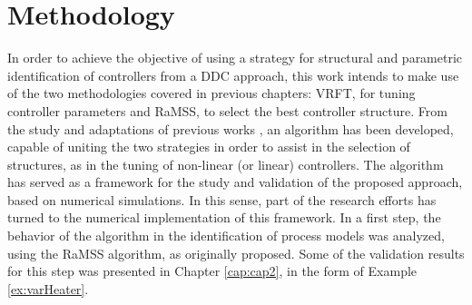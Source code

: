 \section{Methodology}\label{sec:CSS_metod} 

In order to achieve the objective of using a strategy for structural and parametric identification of controllers from a DDC approach, this work intends to make use of the two methodologies covered in previous chapters: VRFT, for tuning controller parameters and RaMSS, to select the best controller structure.
From the study and adaptations of previous works \citep{retesNARMAXModelIdentification2019}, an algorithm has been developed, capable of uniting the two strategies in order to assist in the selection of structures, as in the tuning of non-linear (or linear) controllers.
The algorithm has served as a framework for the study and validation of the proposed approach, based on numerical simulations.
In this sense, part of the research efforts has turned to the numerical implementation of this framework.
In a first step, the behavior of the algorithm in the identification of process models was analyzed, using the RaMSS algorithm, as originally proposed.
Some of the validation results for this step was presented in Chapter \ref{cap:cap2}, in the form of Example \ref{ex:varHeater}.


